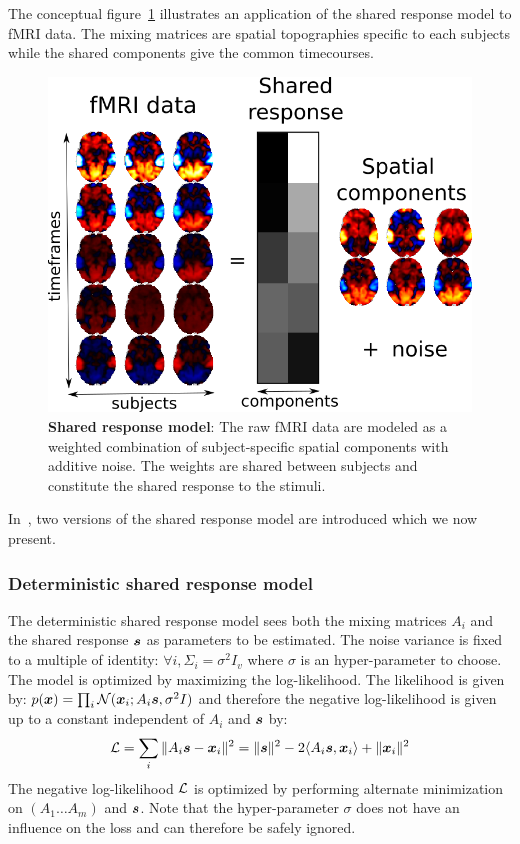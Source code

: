 The conceptual figure~\ref{fig:srm:conceptual_figure} illustrates an 
application of the shared response model to fMRI data. The mixing
matrices are spatial topographies specific to each subjects while the shared
components give the common timecourses.

\begin{figure}
  \centering
  \includegraphics[scale=0.3]{figures/srm/conceptual_figure31.png}
  \caption{\textbf{Shared response model}: The raw fMRI data are modeled as a weighted combination of subject-specific spatial components with additive noise. The weights are shared between subjects and constitute the shared response to the stimuli.}
  \label{fig:srm:conceptual_figure}
\end{figure}

In~\cite{chen2015reduced, anderson2016enabling}, two versions of the shared response model are
introduced which we now present.
\subsubsection{Deterministic shared response model}
\label{sec:deterministicsrm}
The deterministic shared response model sees both the mixing matrices $A_i$ and
the shared response $\boldsymbol{s}$ as parameters to be
estimated. The noise variance is fixed to a multiple of identity: $\forall i,
\Sigma_i=\sigma^2 I_v$ where $\sigma$ is an hyper-parameter to choose.
The model is optimized by maximizing the log-likelihood.
The likelihood is given by: $p(\boldsymbol{x}) = \prod_i \mathcal{N}(\boldsymbol{x}_i; A_i \boldsymbol{s}, \sigma^2 I)$ and
therefore the negative log-likelihood is given up to a constant independent of
$A_i$ and $\boldsymbol{s}$ by:
\begin{align}
  \mathcal{L} = \sum_i \|A_i \boldsymbol{s} - \boldsymbol{x}_i \|^2 = \| \boldsymbol{s} \|^2 -2 \langle{ A_i \boldsymbol{s}},{ \boldsymbol{x}_i }\rangle + \| \boldsymbol{x}_i \|^2
  \label{eq:detsrmloss}
\end{align}
The negative log-likelihood $\mathcal{L}$ is optimized by performing alternate minimization on $(A_1 \dots A_m)$
and $\boldsymbol{s}$. Note that the hyper-parameter $\sigma$ does not have an influence on
the loss and can therefore be safely ignored.

